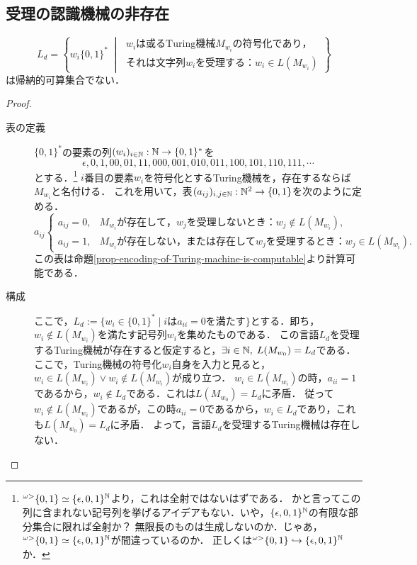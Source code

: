 \documentclass[uplatex, dvipdfmx]{jsreport}
\begin{document}
\subsection{受理の認識機械の非存在}

\begin{theorem}[受理の認識機械の非存在]\label{thm-受理の認識機械の非存在}
    \[L_d=\left\{w_i\{0,1\}^*\;\middle|\;\begin{array}{l}
        w_iは或る\mathrm{Turing}機械M_{w_i}の符号化であり，\\
        それは文字列w_iを受理する：w_i\in L(M_{w_i})
    \end{array}\right\}\]
    は帰納的可算集合でない．
\end{theorem}
\begin{proof}\mbox{}
    \begin{description}
        \item[表の定義] 
    $\{0,1\}^*$の要素の列$(w_i)_{i\in\mathbb{N}}:\mathbb{N}\to\{0,1\}^*$を
    \[\epsilon,0,1,00,01,11,000,001,010,011,100,101,110,111,\cdots\]
    とする．\footnote{${}^{\omega>}\{0,1\}\simeq\{\epsilon,0,1\}^{\mathbb{N}}$より，これは全射ではないはずである．
    かと言ってこの列に含まれない記号列を挙げるアイデアもない．いや，$\{\epsilon,0,1\}^{\mathbb{N}}$の有限な部分集合に限れば全射か？
    無限長のものは生成しないのか．じゃあ，${}^{\omega>}\{0,1\}\simeq\{\epsilon,0,1\}^{\mathbb{N}}$が間違っているのか．
    正しくは${}^{\omega>}\{0,1\}\hookrightarrow\{\epsilon,0,1\}^{\mathbb{N}}$か．}
    $i$番目の要素$w_i$を符号化とするTuring機械を，存在するならば$M_{w_i}$と名付ける．
    これを用いて，表$(a_{ij})_{i,j\in\mathbb{N}}:\mathbb{N}^2\to\{0,1\}$を次のように定める．
    \[a_{ij}\begin{cases}
        a_{ij}=0,&M_{w_i}が存在して，w_jを受理しないとき：w_j\notin L(M_{w_i}),\\
        a_{ij}=1,&M_{w_i}が存在しない，または存在してw_jを受理するとき：w_j\in L(M_{w_i}).
    \end{cases}\]
    この表は命題\ref{prop-encoding-of-Turing-machine-is-computable}より計算可能である．
        \item[構成]
    ここで，$L_d:=\{w_i\in\{0,1\}^*\mid iはa_{ii}=0を満たす\}$とする．即ち，$w_i\notin L(M_{w_i})$を満たす記号列$w_i$を集めたものである．
    この言語$L_d$を受理するTuring機械が存在すると仮定すると，$\exists i\in\mathbb{N},\;L(M_{w_0})=L_d$である．
    ここで，Turing機械の符号化$w_i$自身を入力と見ると，$w_i\in L(M_{w_i})\lor w_i\notin L(M_{w_i})$が成り立つ．
    $w_i\in L(M_{w_i})$の時，$a_{ii}=1$であるから，$w_i\notin L_d$である．これは$L(M_{w_0})=L_d$に矛盾．
    従って$w_i\notin L(M_{w_i})$であるが，この時$a_{ii}=0$であるから，$w_i\in L_d$であり，これも$L(M_{w_0})=L_d$に矛盾．
    よって，言語$L_d$を受理するTuring機械は存在しない．
    \end{description}
\end{proof}
\end{document}
